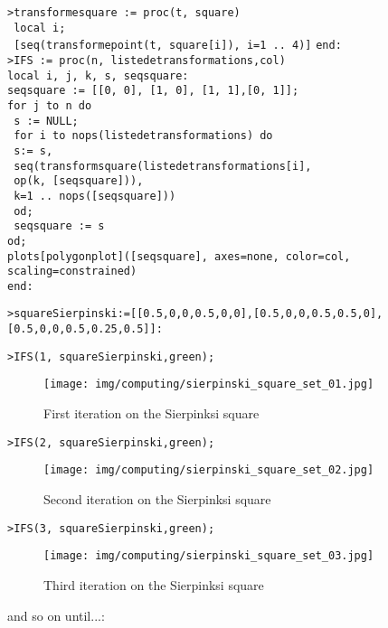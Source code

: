 	\texttt{>transforme\textunderscore square := proc(t, square)}\\	
    \texttt{   local i;}\\
    \texttt{   [seq(transforme\textunderscore point(t, square[i]), i=1 .. 4)]}    
	\texttt{end:}\\

	\texttt{>IFS := proc(n, liste\textunderscore de\textunderscore transformations,col)}\\
     \texttt{local i, j, k, s, seq\textunderscore  square:}\\
     \texttt{seq\textunderscore square := [[0, 0], [1, 0], [1, 1],[0, 1]];}\\
     \texttt{for j to n do}\\
     \texttt{   s := NULL;}\\   
     \texttt{   for i to nops(liste\textunderscore de\textunderscore transformations) do}\\
        \texttt{   {} {} {} s:= s,}\\
        \texttt{   {} {} {} seq(transform\textunderscore square(liste\textunderscore de\textunderscore transformations[i],}\\
        \texttt{   {} {} {} op(k, [seq\textunderscore square])),}\\
        \texttt{   {} {} {} k=1 .. nops([seq\textunderscore square]))}\\
       \texttt{   {} {} {} od;}\\       
      \texttt{   {} {} {} seq\textunderscore square := s}\\
    \texttt{od;}\\
    \texttt{plots[polygonplot]([seq\textunderscore square], axes=none, color=col, scaling=constrained)}\\
  	\texttt{end:}
  	  	
	\texttt{>square\textunderscore  Sierpinski:=[[0.5,0,0,0.5,0,0],[0.5,0,0,0.5,0.5,0], [0.5,0,0,0.5,0.25,0.5]]:}

	\texttt{>IFS(1, square\textunderscore  Sierpinski,green);}
	\begin{figure}[H]
		\centering
		\texttt{[image: img/computing/sierpinski\_square\_set\_01.jpg]}
		\caption[]{First iteration on the Sierpinksi square}
	\end{figure}
	\texttt{>IFS(2, square\textunderscore  Sierpinski,green);}
	\begin{figure}[H]
		\centering
		\texttt{[image: img/computing/sierpinski\_square\_set\_02.jpg]}
		\caption[]{Second iteration on the Sierpinksi square}
	\end{figure}
	\texttt{>IFS(3, square\textunderscore  Sierpinski,green);}
	\begin{figure}[H]
		\centering
		\texttt{[image: img/computing/sierpinski\_square\_set\_03.jpg]}
		\caption[]{Third iteration on the Sierpinksi square}
	\end{figure}
	and so on until...:
	
